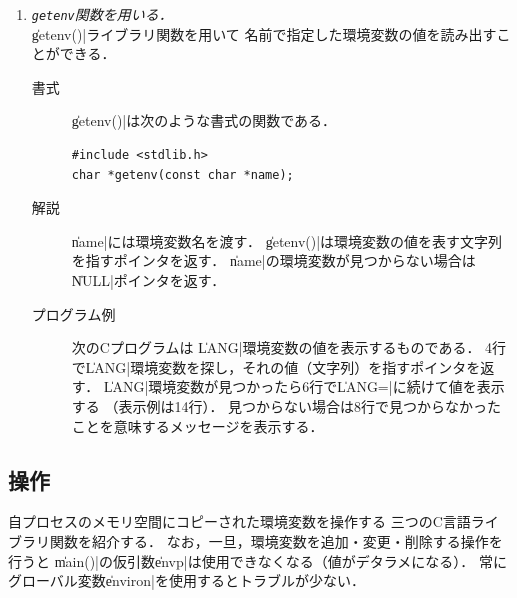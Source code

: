 \begin{enumerate}
\item \emph{\texttt{getenv}関数を用いる．} \\
  \|getenv()|ライブラリ関数を用いて
  名前で指定した環境変数の値を読み出すことができる．

  \begin{description}
  \item [書式] \|getenv()|は次のような書式の関数である．

\begin{lstlisting}[numbers=none]
#include <stdlib.h>
char *getenv(const char *name);
\end{lstlisting}

  \item [解説] \|name|には環境変数名を渡す．
    \|getenv()|は環境変数の値を表す文字列を指すポインタを返す．
    \|name|の環境変数が見つからない場合は\|NULL|ポインタを返す．

  \item [プログラム例]
    次のCプログラムは
    \|LANG|環境変数の値を表示するものである．
    4行で\|LANG|環境変数を探し，それの値（文字列）を指すポインタを返す．
    \|LANG|環境変数が見つかったら6行で\|LANG=|に続けて値を表示する
    （表示例は14行）．
    見つからない場合は8行で見つからなかったことを意味するメッセージを表示する．

    
  \end{description}
\end{enumerate}

\newpage

\subsection{操作}
自プロセスのメモリ空間にコピーされた環境変数を操作する
三つのC言語ライブラリ関数を紹介する．
なお，一旦，環境変数を追加・変更・削除する操作を行うと
\|main()|の仮引数\|envp|は使用できなくなる（値がデタラメになる）．
常にグローバル変数\|environ|を使用するとトラブルが少ない．

